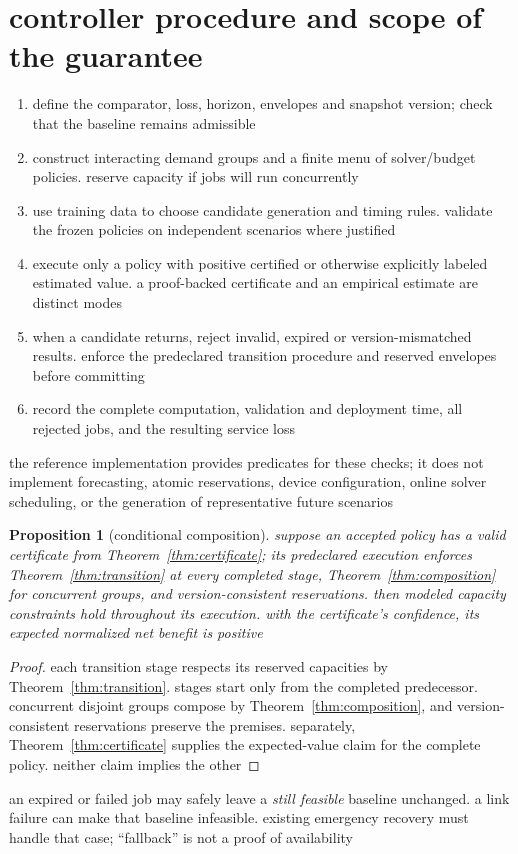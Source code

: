\documentclass[11pt,a4paper]{article}
\newtheorem{proposition}[theorem]{Proposition}
\newcommand{\1}{\mathbf{1}}
\begin{document}
\section{controller procedure and scope of the guarantee}
\begin{enumerate}
\item define the comparator, loss, horizon, envelopes and snapshot version; check that the baseline remains admissible
\item construct interacting demand groups and a finite menu of solver/budget policies. reserve capacity if jobs will run concurrently
\item use training data to choose candidate generation and timing rules. validate the frozen policies on independent scenarios where justified
\item execute only a policy with positive certified or otherwise explicitly labeled estimated value. a proof-backed certificate and an empirical estimate are distinct modes
\item when a candidate returns, reject invalid, expired or version-mismatched results. enforce the predeclared transition procedure and reserved envelopes before committing
\item record the complete computation, validation and deployment time, all rejected jobs, and the resulting service loss
\end{enumerate}
the reference implementation provides predicates for these checks; it does not implement forecasting, atomic reservations, device configuration, online solver scheduling, or the generation of representative future scenarios

\begin{proposition}[conditional composition]\label{prop:composed}
suppose an accepted policy has a valid certificate from Theorem~\ref{thm:certificate}; its predeclared execution enforces Theorem~\ref{thm:transition} at every completed stage, Theorem~\ref{thm:composition} for concurrent groups, and version-consistent reservations. then modeled capacity constraints hold throughout its execution. with the certificate's confidence, its expected normalized net benefit is positive
\end{proposition}
\begin{proof}
each transition stage respects its reserved capacities by Theorem~\ref{thm:transition}. stages start only from the completed predecessor. concurrent disjoint groups compose by Theorem~\ref{thm:composition}, and version-consistent reservations preserve the premises. separately, Theorem~\ref{thm:certificate} supplies the expected-value claim for the complete policy. neither claim implies the other
\end{proof}
an expired or failed job may safely leave a \emph{still feasible} baseline unchanged. a link failure can make that baseline infeasible. existing emergency recovery must handle that case; ``fallback'' is not a proof of availability
\end{document}
